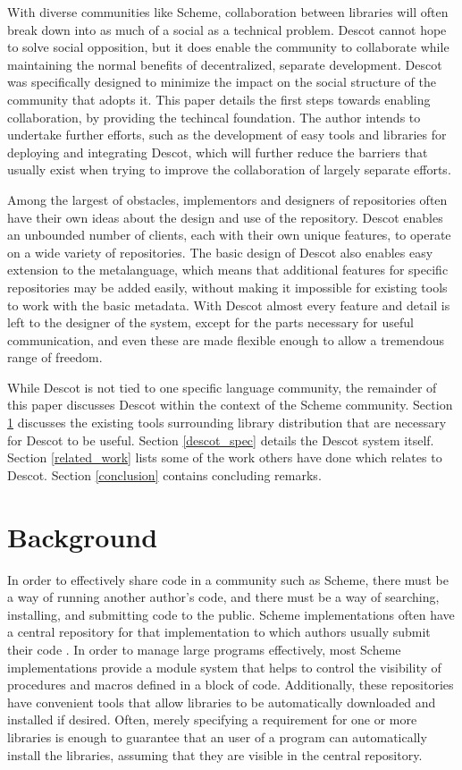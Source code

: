 \documentclass[9pt,cm,twocolumn,preprint]{sigplanconf}
\begin{document}
With diverse communities like Scheme, 
collaboration between libraries will often break down 
into as much of a social as a technical problem.
Descot cannot hope to solve social opposition,
but it does enable the community to collaborate 
while maintaining the normal benefits of decentralized, 
separate development. 
Descot was specifically designed to minimize the 
impact on the social structure of the community that 
adopts it. 
This paper details the first steps towards enabling collaboration, 
by providing the techincal foundation. 
The author intends to undertake further efforts, 
such as the development of easy tools and libraries for deploying 
and integrating Descot, 
which will further reduce the barriers that usually exist when
trying to improve the collaboration of largely separate 
efforts.

Among the largest of obstacles, implementors and designers of 
repositories often have their own ideas about the design and use 
of the repository. 
Descot enables an unbounded number of clients, 
each with their own unique features, to operate on a wide 
variety of repositories. 
The basic design of Descot also enables easy extension to the 
metalanguage, 
which means that additional features for specific repositories 
may be added easily, 
without making it impossible for existing tools to work with the 
basic metadata. 
With Descot almost every feature and detail is left to the designer 
of the system, except for the parts necessary for useful communication, 
and even these are made flexible enough to allow a tremendous range 
of freedom. 

While Descot is not tied to one specific language community, 
the remainder of this paper discusses Descot within the context of the 
Scheme community. 
Section \ref{background} discusses the existing tools surrounding 
library distribution that are necessary for Descot to be useful. 
Section \ref{descot_spec} details the Descot system itself. 
Section \ref{related_work} lists some of the work others have done 
which relates to Descot.
Section \ref{conclusion} contains concluding remarks.

\section{Background}
\label{background}
In order to effectively share code in a community such as Scheme, 
there must be a way of running another author's code, and there 
must be a way of searching, installing, and submitting code to 
the public. 
Scheme implementations often have a central repository for that 
implementation to which authors usually submit their code 
\cite{eggs,planet,bigloorepo}. 
In order to manage large programs effectively, most Scheme implementations 
provide a module system that helps to control the visibility 
of procedures and macros defined in a block of code. 
Additionally, these repositories have convenient tools that allow 
libraries to be automatically downloaded and installed if desired. 
Often, merely specifying a requirement for one or more libraries 
is enough to guarantee that an user of a program can
automatically install the libraries, assuming that they are visible in 
the central repository. 
\end{document}
